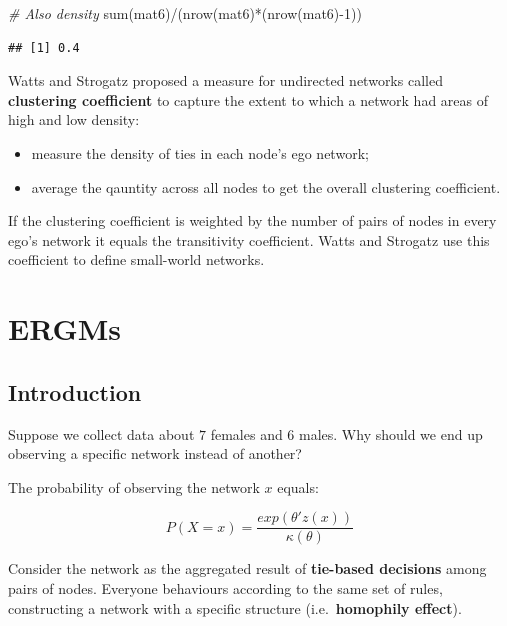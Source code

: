 \documentclass[
  notitlepage,
  onecolumn,
  openany]{book}
\newenvironment{Shaded}{\begin{snugshade}}{\end{snugshade}}
\newcommand{\CommentTok}[1]{\textcolor[rgb]{0.56,0.35,0.01}{\textit{#1}}}
\newcommand{\DecValTok}[1]{\textcolor[rgb]{0.00,0.00,0.81}{#1}}
\newcommand{\FunctionTok}[1]{\textcolor[rgb]{0.00,0.00,0.00}{#1}}
\newcommand{\NormalTok}[1]{#1}
\newcommand{\SpecialCharTok}[1]{\textcolor[rgb]{0.00,0.00,0.00}{#1}}
\providecommand{\tightlist}{%
  \setlength{\itemsep}{0pt}\setlength{\parskip}{0pt}}
\begin{document}
\begin{Shaded}
\begin{Highlighting}[]
\CommentTok{\# Also density}
\FunctionTok{sum}\NormalTok{(mat6)}\SpecialCharTok{/}\NormalTok{(}\FunctionTok{nrow}\NormalTok{(mat6)}\SpecialCharTok{*}\NormalTok{(}\FunctionTok{nrow}\NormalTok{(mat6)}\SpecialCharTok{{-}}\DecValTok{1}\NormalTok{))}
\end{Highlighting}
\end{Shaded}

\begin{verbatim}
## [1] 0.4
\end{verbatim}

Watts and Strogatz proposed a measure for undirected networks called \textbf{clustering coefficient} to capture the extent to which a network had areas of high and low density:

\begin{itemize}
\tightlist
\item
  measure the density of ties in each node's ego network;
\item
  average the qauntity across all nodes to get the overall clustering coefficient.
\end{itemize}

If the clustering coefficient is weighted by the number of pairs of nodes in every ego's network it equals the transitivity coefficient. Watts and Strogatz use this coefficient to define small-world networks.

\hypertarget{ergms}{%
\chapter{ERGMs}\label{ergms}}

\hypertarget{introduction-1}{%
\section{Introduction}\label{introduction-1}}

Suppose we collect data about \(7\) females and \(6\) males. Why should we end up observing a specific network instead of another?

The probability of observing the network \(x\) equals:

\[
P(X=x) = \frac{exp(\theta'z(x))}{\kappa(\theta)}
\]

Consider the network as the aggregated result of \textbf{tie-based decisions} among pairs of nodes. Everyone behaviours according to the same set of rules, constructing a network with a specific structure (i.e.~\textbf{homophily effect}).
\end{document}
